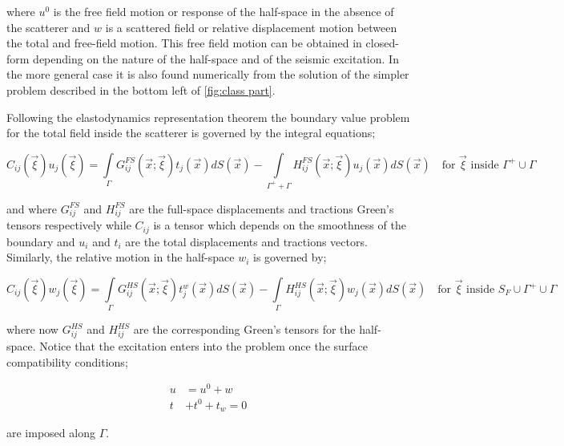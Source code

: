 \documentclass[12pt,letterpaper]{article}
\begin{document}
where ${u^0}$ is the free field motion or response of the half-space in the absence of the scatterer and ${w}$ is a scattered field or relative displacement motion between the total and free-field motion. This free field motion can be obtained in closed-form depending on the nature of the half-space and of the seismic excitation. In the more general case it is also found numerically from the solution of the simpler problem described in the bottom left of \cref{fig:class part}.

Following the elastodynamics representation theorem the boundary value problem for the total field inside the scatterer is governed by the integral equations;

\begin{equation}
{C_{ij}}(\vec \xi ){u_j}(\vec \xi ) = \int\limits_\Gamma  {G_{ij}^{FS}(\vec x;\vec \xi )} {t_j}(\vec x)dS(\vec x) - \int\limits_{\Gamma^+ + \Gamma } {H_{ij}^{FS}(\vec x;\vec \xi )} {u_j}(\vec x)dS(\vec x) \quad \text{for $\vec{\xi}$ inside $\Gamma^+ \cup \Gamma$}
\label{Vara 1}
\end{equation}

and where $G_{ij}^{FS}$ and $H_{ij}^{FS}$ are the full-space displacements and tractions Green's tensors respectively while $C_{ij}$ is a tensor which depends on the smoothness of the boundary and $u_i$ and $t_i$ are the total displacements and tractions vectors. Similarly, the relative motion in the half-space $w_i$ is governed by;

\begin{equation}
{C_{ij}}(\vec \xi ){w_j}(\vec \xi ) = \int\limits_\Gamma  {G_{ij}^{HS}(\vec x;\vec \xi )} t_j^w(\vec x)dS(\vec x) - \int\limits_\Gamma  {H_{ij}^{HS}(\vec x;\vec \xi )} {w_j}(\vec x)dS(\vec x) \quad \text{for $\vec{\xi}$ inside $S_F \cup \Gamma^+ \cup \Gamma$}
\label{Vara 2}
\end{equation}

where now $G_{ij}^{HS}$ and $H_{ij}^{HS}$ are the corresponding Green's tensors for the half-space. Notice that the excitation enters into the problem once the surface compatibility conditions;

\begin{equation} \label{comp}
\begin{split}
{u}& ={u^0}+{w}\\
{t}&+{t^0}+{t_w}=0
\end{split}
\end{equation}

are imposed along $\Gamma$.
\end{document}
